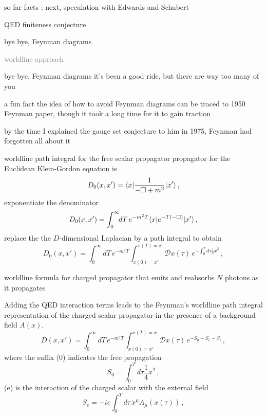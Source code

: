 \begin{frame}{so far facts ; next, speculation with Edwards and Schubert}
\begin{enumerate}
              \item
QED finiteness conjecture
              \item {\Large
bye bye, Feynman diagrams
                  }\textcolor{gray}{\small
              \item
worldline approach
                    }
\end{enumerate}
\end{frame}


\begin{frame}{bye bye, Feynman diagrams}
it's been a good ride, but there are way too many of you
\end{frame}

\begin{frame}{a fun fact}
the idea of how to avoid Feynman diagrams can be traced to 1950 Feynman
paper, though it took a long time for it to gain
traction

\bigskip

by the time I explained the gauge set conjecture to
him in 1975, Feynman had forgotten all about it
\end{frame}

\begin{frame}{worldline path integral for the free scalar propagator}
propagator for the Euclidean
Klein-Gordon equation is
\[ %
D_0(x,x')=\bra{x}\frac{1}{-\Box +m^2}\ket{x'}
\,,
\] %
exponentiate the
denominator
\[ %
D_0(x,x')=\int_0^\infty\!\!dT\,{e}^{-m^2T}\bra{x}e^{-T(-\Box)}\ket{x'}
\,,
\] %
replace the the $D$-dimensional Laplacian by a path integral
to obtain
\[ %
D_0(x,x')=\int_0^\infty\!\!dT\,e^{-m^2T}
\int_{x(0)=x'}^{x(T)=x}\!\!\!\!\mathcal{D}x(\tau)\,
    e^{-\int_0^T\!\!d\tau \frac{1}{4}\dot{x}^2}
\,,
\] %
\end{frame}

\begin{frame}{worldline formula for charged propagator}
that emits and reabsorbs $N$ photons as it
propagates%

\medskip

Adding the QED
interaction terms leads to the Feynman's worldline path integral
representation of the charged scalar propagator
in the presence of a background field $A(x)$,
\[ %
D(x,x')=\int_0^\infty\!\!dT\,e^{-m^2T}
    \int_{x(0)=x'}^{x(T)=x}\!\!\mathcal{D}x(\tau)\,
            {e}^{-S_0-S_e-S_i}
\,,
\] %
where the suffix (0) indicates the free propagation
\[ %
S_0 = \int_0^T\!\!d\tau \frac{1}{4}\dot{x}^2
\,,
\] %
(e) is the interaction of the charged scalar with the external field
\[ %
S_e = -ie\int_0^T\!\!d\tau\,\dot{x}^\mu A_\mu(x(\tau))
\,,
\] %
\end{frame}

